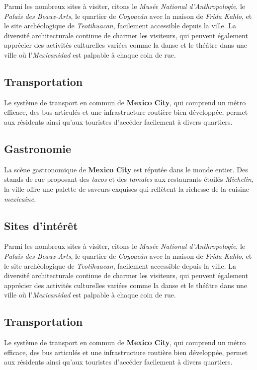 \documentclass[12pt, a4paper]{article}
\begin{document}
Parmi les nombreux sites à visiter, citons le \textit{Musée National d'Anthropologie}, le \textit{Palais des Beaux-Arts}, le quartier de \textit{Coyoacán} avec la maison de \textit{Frida Kahlo}, et le site archéologique de \textit{Teotihuacan}, facilement accessible depuis la ville.
La diversité architecturale continue de charmer les visiteurs, qui peuvent également apprécier des activités culturelles variées comme la danse et le théâtre dans une ville où l'\textit{Mexicanidad} est palpable à chaque coin de rue. \subsection*{\textbf{Transportation}} Le système de transport en commun de \textbf{Mexico City}, qui comprend un métro efficace, des bus articulés et une infrastructure routière bien développée, permet aux résidents ainsi qu'aux touristes d'accéder facilement à divers quartiers.

\subsection*{\textbf{Gastronomie}}

La scène gastronomique de \textbf{Mexico City} est réputée dans le monde entier. Des stands de rue proposant des \textit{tacos} et des \textit{tamales} aux restaurants étoilés \textit{Michelin}, la ville offre une palette de saveurs exquises qui reflètent la richesse de la cuisine \textit{mexicaine}.

\subsection*{\textbf{Sites d'intérêt}}

Parmi les nombreux sites à visiter, citons le \textit{Musée National d'Anthropologie}, le \textit{Palais des Beaux-Arts}, le quartier de \textit{Coyoacán} avec la maison de \textit{Frida Kahlo}, et le site archéologique de \textit{Teotihuacan}, facilement accessible depuis la ville.
La diversité architecturale continue de charmer les visiteurs, qui peuvent également apprécier des activités culturelles variées comme la danse et le théâtre dans une ville où l'\textit{Mexicanidad} est palpable à chaque coin de rue. \subsection*{\textbf{Transportation}} Le système de transport en commun de \textbf{Mexico City}, qui comprend un métro efficace, des bus articulés et une infrastructure routière bien développée, permet aux résidents ainsi qu'aux touristes d'accéder facilement à divers quartiers.
\end{document}
